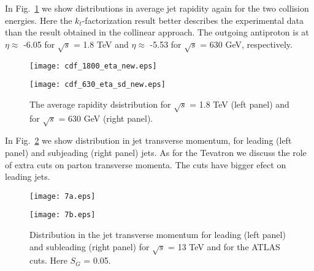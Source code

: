 \documentclass[12pt]{article}
\begin{document}
In Fig.~\ref{fig:cdf_y} we show distributions in average jet rapidity again for 
the two collision energies. Here the $k_t$-factorization result 
better describes the experimental data than the result obtained in 
the collinear approach. The outgoing antiproton is at
$\eta \approx$ -6.05 for $\sqrt{s}$ = 1.8 TeV and $\eta \approx$ -5.53 for $\sqrt{s}$ = 630 GeV,
respectively.

\begin{figure}[!htbp]
\begin{minipage}{0.47\textwidth}
 \centerline{\texttt{[image: cdf\_1800\_eta\_new.eps]}}
\end{minipage}
\hspace{0.5cm}
\begin{minipage}{0.47\textwidth}
 \centerline{\texttt{[image: cdf\_630\_eta\_sd\_new.eps]}}
\end{minipage}
   \caption{
\small The average rapidity dsistribution for $\sqrt{s}$ = 1.8 TeV
(left panel) and for $\sqrt{s}$ = 630 GeV (right panel).
}
 \label{fig:cdf_y}
\end{figure}

In Fig.~\ref{fig:7} we show distribution in jet transverse momentum,
for leading (left panel) and subjeading (right panel) jets.
As for the Tevatron we discuss the role of extra cuts on parton 
transverse momenta. The cuts have bigger efect on leading jets.

\begin{figure}[!htbp]
\begin{minipage}{0.47\textwidth}
 \centerline{\texttt{[image: 7a.eps]}}
\end{minipage}
\hspace{0.5cm}
\begin{minipage}{0.47\textwidth}
 \centerline{\texttt{[image: 7b.eps]}}
\end{minipage}
   \caption{
\small Distribution in the jet transverse momentum for leading
(left panel) and subleading (right panel) for $\sqrt{s}$ = 13 TeV
and for the ATLAS cuts. Here $S_G$ = 0.05.
}
 \label{fig:7}
\end{figure}
\end{document}
